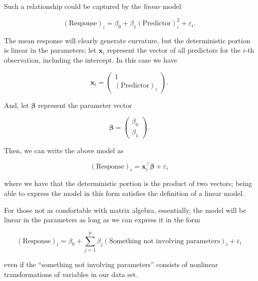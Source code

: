 \documentclass[
  letterpaper,
  DIV=11,
  numbers=noendperiod]{scrreprt}
\theoremstyle{definition}
\theoremstyle{definition}
\theoremstyle{remark}
\begin{document}
Such a relationship could be captured by the \emph{linear} model

\[(\text{Response})_i = \beta_0 + \beta_1 (\text{Predictor})_i^2 + \varepsilon_i.\]

The mean response will clearly generate curvature, but the deterministic
portion is linear in the parameters; let \(\mathbf{x}_i\) represent the
vector of all predictors for the \(i\)-th observation, including the
intercept. In this case we have

\[\mathbf{x}_i = \begin{pmatrix} 1 \\ (\text{Predictor})_i \end{pmatrix}.\]

And, let \(\boldsymbol{\beta}\) represent the parameter vector

\[\boldsymbol{\beta} = \begin{pmatrix} \beta_0 \\ \beta_1 \end{pmatrix}.\]

Then, we can write the above model as

\[(\text{Response})_i = \mathbf{x}_i^\top \boldsymbol{\beta} + \varepsilon_i\]

where we have that the deterministic portion is the product of two
vectors; being able to express the model in this form satisfies the
definition of a linear model.

\begin{tcolorbox}[enhanced jigsaw, left=2mm, toprule=.15mm, arc=.35mm, breakable, opacitybacktitle=0.6, opacityback=0, rightrule=.15mm, colbacktitle=quarto-callout-note-color!10!white, coltitle=black, leftrule=.75mm, toptitle=1mm, colframe=quarto-callout-note-color-frame, titlerule=0mm, title=\textcolor{quarto-callout-note-color}{\faInfo}\hspace{0.5em}{Note}, bottomrule=.15mm, colback=white, bottomtitle=1mm]

For those not as comfortable with matrix algebra, essentially, the model
will be linear in the parameters as long as we can express it in the
form

\[(\text{Response})_i = \beta_0 + \sum_{j=1}^{p} \beta_j (\text{Something not involving parameters})_i + \varepsilon_i\]

even if the ``something not involving parameters'' consists of nonlinear
transformations of variables in our data set.

\end{tcolorbox}
\end{document}

